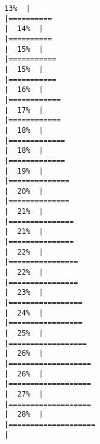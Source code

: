 \documentclass[
]{article}
\begin{document}
\begin{verbatim}
13%  |                                                                              |==========                                                            |  14%  |                                                                              |==========                                                            |  15%  |                                                                              |===========                                                           |  15%  |                                                                              |===========                                                           |  16%  |                                                                              |============                                                          |  17%  |                                                                              |============                                                          |  18%  |                                                                              |=============                                                         |  18%  |                                                                              |=============                                                         |  19%  |                                                                              |==============                                                        |  20%  |                                                                              |==============                                                        |  21%  |                                                                              |===============                                                       |  21%  |                                                                              |===============                                                       |  22%  |                                                                              |================                                                      |  22%  |                                                                              |================                                                      |  23%  |                                                                              |=================                                                     |  24%  |                                                                              |=================                                                     |  25%  |                                                                              |==================                                                    |  26%  |                                                                              |===================                                                   |  26%  |                                                                              |===================                                                   |  27%  |                                                                              |===================                                                   |  28%  |                                                                              |====================                                                  |  
\end{verbatim}
\end{document}
